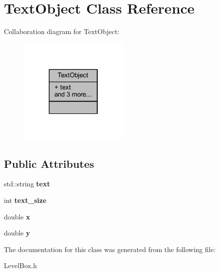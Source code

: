 \hypertarget{class_text_object}{}\section{Text\+Object Class Reference}
\label{class_text_object}


Collaboration diagram for Text\+Object\+:\nopagebreak
\begin{figure}[H]
\begin{center}
\leavevmode
\includegraphics[width=154pt]{class_text_object__coll__graph}
\end{center}
\end{figure}
\subsection*{Public Attributes}
\begin{DoxyCompactItemize}
\item 
\mbox{\label{class_text_object_a89e65c86a7c0bd9dfbcf759e49c7660e}} 
std\+::string {\bfseries text}
\item 
\mbox{\label{class_text_object_a3a2dc3c26c74c36885808dea05813a47}} 
int {\bfseries text\+\_\+size}
\item 
\mbox{\label{class_text_object_a8d3ff37567717527671500ed9b2bd02a}} 
double {\bfseries x}
\item 
\mbox{\label{class_text_object_a0aa9a294298001812ec8c3b9ca990ef2}} 
double {\bfseries y}
\end{DoxyCompactItemize}


The documentation for this class was generated from the following file\+:\begin{DoxyCompactItemize}
\item 
Level\+Box.\+h\end{DoxyCompactItemize}

